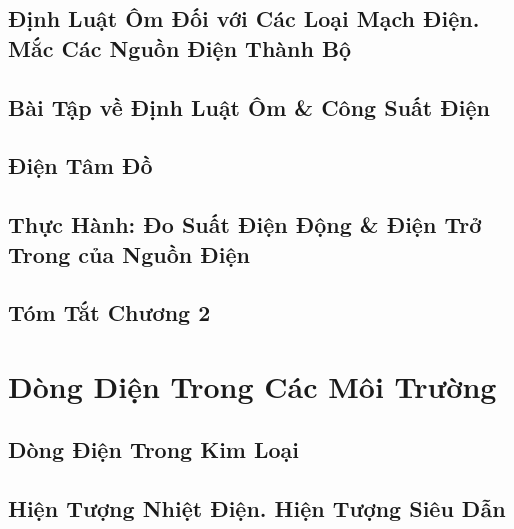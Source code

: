 \documentclass[oneside]{book}
\numberwithin{equation}{section}
\begin{document}

\section{Định Luật Ôm Đối với Các Loại Mạch Điện. Mắc Các Nguồn Điện Thành Bộ}


\section{Bài Tập về Định Luật Ôm \& Công Suất Điện}


\section{Điện Tâm Đồ}


\section{Thực Hành: Đo Suất Điện Động \& Điện Trở Trong của Nguồn Điện}


\section{Tóm Tắt Chương 2}


\chapter{Dòng Diện Trong Các Môi Trường}

\section{Dòng Điện Trong Kim Loại}


\section{Hiện Tượng Nhiệt Điện. Hiện Tượng Siêu Dẫn}
\end{document}
